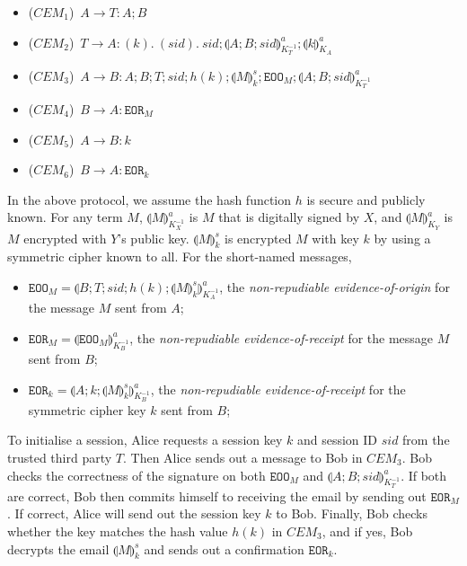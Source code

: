 \documentclass{article}
\newcommand{\setenc}[1]{\llparenthesis #1 \rrparenthesis}
\newcommand{\sym}[1]{\texttt{#1}}
\begin{document}
\begin{itemize}
\item[] ($CEM_{1}$)\ $A\rightarrow T: A; B$ 
\item[] ($CEM_{2}$)\ $T\rightarrow A: (k).\ (sid).\ sid;\setenc{A;B;sid}^a_{K^{-1}_T};\setenc{k}^a_{K_A}$
\item[] ($CEM_{3}$)\ $A\rightarrow B: A; B; T; sid; h(k);\setenc{M}^s_{k};\sym{EOO}_M;\setenc{A;B;sid}^a_{K^{-1}_T}$
\item[] ($CEM_{4}$)\ $B\rightarrow A: \sym{EOR}_M$
\item[] ($CEM_{5}$)\ $A\rightarrow B: k$
\item[] ($CEM_{6}$)\ $B\rightarrow A: \sym{EOR}_k$
\end{itemize}

\noindent In the above protocol, we assume the hash function $h$ is secure and publicly known. For any term $M$, $\setenc{M}^a_{K^{-1}_X}$ is $M$ that is digitally signed by $X$, and $\setenc{M}^a_{K_Y}$ is $M$ encrypted with $Y$'s public key. $\setenc{M}^s_k$ is encrypted $M$ with key $k$ by using a symmetric cipher known to all. For the short-named messages,
\begin{itemize}
    \item[-] $\sym{EOO}_M = \setenc{B; T; sid; h(k); \setenc{M}^s_{k}}^a_{K_A^{-1}}$, the \emph{non-repudiable evidence-of-origin} for the message $M$ sent from $A$;
    \item[-] $\sym{EOR}_M = \setenc{\sym{EOO}_M}^a_{K_B^{-1}}$, the \emph{non-repudiable evidence-of-receipt} for the message $M$ sent from $B$;
    \item[-] $\sym{EOR}_k = \setenc{A;k;\setenc{M}^s_{k}}^a_{K_B^{-1}}$, the \emph{non-repudiable evidence-of-receipt} for the symmetric cipher key $k$ sent from $B$;
\end{itemize}

To initialise a session, Alice requests a session key $k$ and session ID $sid$ from the trusted third party $T$. Then Alice sends out a message to Bob in $CEM_{3}$. Bob checks the correctness of the signature on both $\sym{EOO}_M$ and $\setenc{A;B;sid}^a_{K^{-1}_T}$. If both are correct, Bob then commits himself to receiving the email by sending out $\sym{EOR}_M$. If correct, Alice will send out the session key $k$ to Bob. Finally, Bob checks whether the key matches the hash value $h(k)$ in $CEM_{3}$, and if yes, Bob decrypts the email $\setenc{M}^s_{k}$ and sends out a confirmation $\sym{EOR}_k$.

\bigskip
\end{document}
